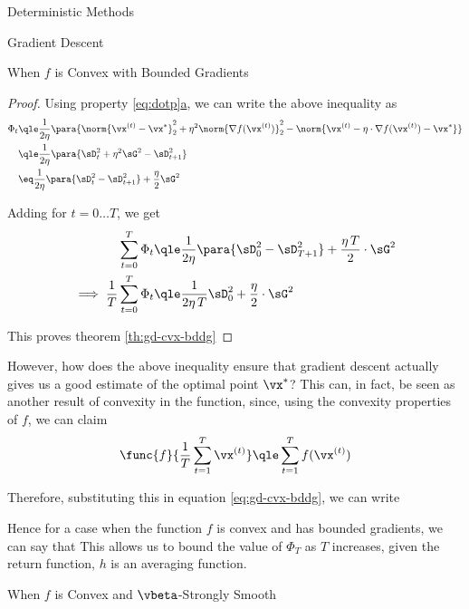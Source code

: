 \documentclass{article}
\newcommand{\x}[1]{\vx^{(#1)}}
\newcommand{\xs}{\vx^{\ast}}
\newcommand{\f}[1]{f(\vx^{(#1)})}
\newcommand{\fs}{f(\vx^\ast)}
\newcommand{\gf}[1]{\nabla f(\vx^{(#1)})}
\begin{document}
\begin{psection}{Deterministic Methods}
\begin{psubsection}{Gradient Descent}
\begin{pssubsection}{When $f$ is Convex with Bounded Gradients}
\begin{theorem}
\begin{proof}
					Using property \hyperref[eq:dotp]{\ref*{eq:dotp}a}, we can write the above inequality as
					\begin{align*}
						\Phi_t	&\qle	\frac{1}{2 \eta} \para{\norm{\x{t} - \xs}_2^2 + \eta^2 \norm{\gf{t}}_2^2 - \norm{\x{t} - \eta \cdot \gf{t} - \xs}} \\
								&\qle	\frac{1}{2 \eta} \para{\sD_t^2 + \eta^2 \sG^2 - \sD_{t + 1}^2} \\
								&\eq	\frac{1}{2 \eta} \para{\sD_t^2 - \sD_{t + 1}^2} + \frac{\eta}{2} \sG^2
					\end{align*}

					Adding for $t = 0 \dots T$, we get
					\begin{align*}
						\sum_{t = 0}^T	\Phi_t						&\qle	\frac{1}{2 \eta} \para{\sD_0^2 - \sD_{T+1}^2} + \frac{\eta\,T}{2} \cdot \sG^2 \\
						\implies \frac{1}{T} \sum_{t = 0}^T	\Phi_t	&\qle	\frac{1}{2 \eta \, T} \sD_0^2 + \frac{\eta}{2} \cdot \sG^2
					\end{align*}

					This proves theorem \ref{th:gd-cvx-bddg}
				\end{proof}
			\end{theorem}

			However, how does the above inequality ensure that gradient descent actually gives us a good estimate of the optimal point $\xs$? This can, in fact, be seen as another result of convexity in the function, since, using the convexity properties of $f$, we can claim
			\begin{align*}
				\func{f}{\frac{1}{T} \sum_{t = 1}^T \x{t}}	\qle	\sum_{t = 1}^T \f{t}
			\end{align*}

			Therefore, substituting this in equation \ref{eq:gd-cvx-bddg}, we can write
			\answer[0.7\textwidth]{
				\begin{equation}
					\func{f}{\frac{1}{T} \sum_{t = 1}^T \x{t}} - \fs	\qle	\frac{1}{2 \eta\, T} \sD_0^2 + \frac{\eta}{2} \cdot \sG^2
					\label{eq:gd-1-bound}
				\end{equation}
			}

			Hence for a case when the function $f$ is convex and has bounded gradients, we can say that This allows us to bound the value of $\Phi_T$ as $T$ increases, given the return function, \ie $h$ is an averaging function.

		\end{pssubsection}

		\begin{pssubsection}{When $f$ is Convex and $\vbeta$-Strongly Smooth}


\end{pssubsection}
\end{psubsection}
\end{psection}
\end{document}
